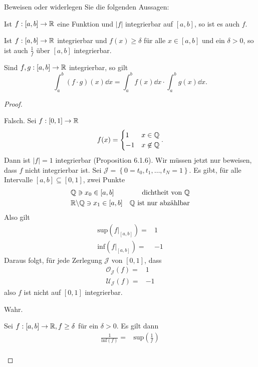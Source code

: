 \begin{Problem}
	Beweisen oder widerlegen Sie die folgenden Aussagen:
	\begin{parts}
	\item Ist $f:[a,b]\to \mathbb{R}$ eine Funktion und $|f|$ integrierbar auf $[a,b]$, so ist es auch $f$.
	\item Ist $f:[a,b]\to \mathbb{R}$ integrierbar und $f(x)\ge \delta$ f\"{u}r alle $x\in [a,b]$ und ein $\delta>0$, so ist auch $\frac{1}{f}$ \"{u}ber $[a,b]$ integrierbar.
	\item Sind $f,g:[a,b]\to \mathbb{R}$ integrierbar, so gilt
		\[
			\int_a^b(f\cdot g)(x)\dd{x}=\int_a^b f(x)\dd{x}\cdot \int_a^b g(x)\dd{x}
		.\] 
	\end{parts}
\end{Problem}
\begin{proof}
	\begin{parts}
	\item Falsch. Sei $f:[0,1]\to \mathbb{R}$
		\[
		f(x)=\begin{cases}
			1 & x\in \mathbb{Q}\\
			-1 & x\not\in \mathbb{Q}
		\end{cases}
		.\] 
		Dann ist $|f|=1$ integrierbar (Proposition 6.1.6). Wir müssen jetzt nur beweisen, dass $f$ nicht integrierbar ist. Sei $\mathcal{J}=\left\{ 0=t_0,t_1,\dots,t_N=1 \right\} $. Es gibt, f\"{u}r alle Intervalle $[a,b]\subseteq [0,1]$, zwei Punkte
		\begin{align*}
			& \mathbb{Q} \ni x_0 \in [a,b] & \text{dichtheit von }\mathbb{Q}\\
			& \mathbb{R}\backslash \mathbb{Q} \ni  x_1 \in [a,b] & \mathbb{Q}\text{ ist nur abzählbar}
		\end{align*}
		Also gilt
		\begin{align*}
			\text{sup}\left( f|_{\left[ a,b \right] } \right) =&1\\
			\text{inf}\left( f|_{[a,b]} \right)=&-1 
		\end{align*}
		Daraus folgt, f\"{u}r jede Zerlegung $\mathcal{J}$ von $[0,1]$, dass
		\begin{align*}
			\mathcal{O}_\mathcal{J}(f)=&1\\
			\mathcal{U}_\mathcal{J}(f)=&-1
		\end{align*}
		also $f$ ist nicht auf $[0,1]$ integrierbar.
	\item Wahr. 
		\begin{tcolorbox}[title=Bemerkung]
			Sei $f:[a,b]\to \mathbb{R}, f\ge \delta$ f\"{u}r ein $\delta>0$. Es gilt dann
			\begin{align*}
				\frac{1}{\text{inf}(f)}=&\text{sup}\left( \frac{1}{f} \right) \\

\end{align*}
\end{tcolorbox}
\end{parts}
\end{proof}
